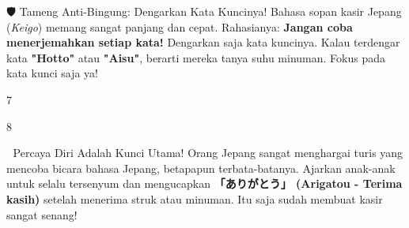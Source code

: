 \begin{lessonbox}{🛡️ Tameng Anti-Bingung: Dengarkan Kata Kuncinya!}
    Bahasa sopan kasir Jepang (\textit{Keigo}) memang sangat panjang dan cepat. Rahasianya: \textbf{Jangan coba menerjemahkan setiap kata!} Dengarkan saja kata kuncinya. Kalau terdengar kata \textbf{"Hotto"} atau \textbf{"Aisu"}, berarti mereka tanya suhu minuman. Fokus pada kata kunci saja ya!
\end{lessonbox}

\begin{convobox}{7}
    \noindent
      
       
      
       
     

    \vspace{1.5em}
\end{convobox}

\begin{convobox}{8}
    \noindent
       
      
      
      

    \vspace{1.5em}
\end{convobox}

\begin{lessonbox}{🌟 Percaya Diri Adalah Kunci Utama!}
    Orang Jepang sangat menghargai turis yang mencoba bicara bahasa Jepang, betapapun terbata-batanya. Ajarkan anak-anak untuk selalu tersenyum dan mengucapkan \textbf{「ありがとう」 (Arigatou - Terima kasih)} setelah menerima struk atau minuman. Itu saja sudah membuat kasir sangat senang!
\end{lessonbox}

